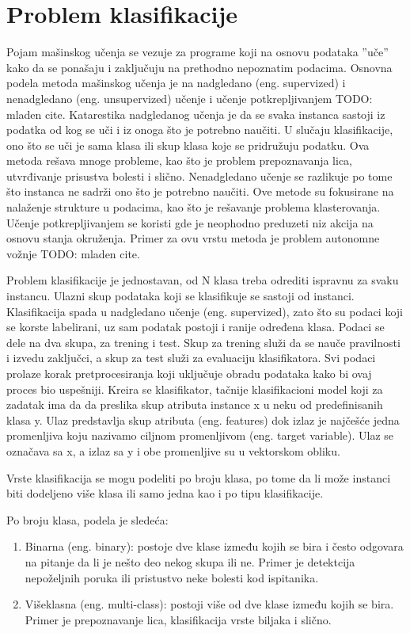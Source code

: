 \documentclass[12pt,oneside]{memoir}
\begin{document}
\chapter{Problem klasifikacije}

Pojam mašinskog učenja se vezuje za programe koji na osnovu podataka ”uče” kako da se ponašaju i zaključuju na prethodno nepoznatim podacima. Osnovna podela metoda mašinskog učenja je na nadgledano (eng. supervized) i nenadgledano (eng. unsupervized) učenje i učenje potkrepljivanjem TODO: mladen cite. Katarestika nadgledanog učenja je da se svaka instanca sastoji iz podatka od kog se uči i iz onoga što je potrebno naučiti. U slučaju klasifikacije, ono što se uči je sama klasa ili skup klasa koje se pridružuju podatku. Ova metoda rešava mnoge probleme, kao što je problem prepoznavanja lica, utvrđivanje prisustva bolesti i slično. Nenadgledano učenje se razlikuje po tome što instanca ne sadrži ono što je potrebno naučiti. Ove metode su fokusirane na nalaženje strukture u podacima, kao što je rešavanje problema klasterovanja. Učenje potkrepljivanjem se koristi gde je neophodno preduzeti niz akcija na osnovu stanja okruženja. Primer za ovu vrstu metoda je problem autonomne vožnje TODO: mladen cite.

Problem klasifikacije je jednostavan, od N klasa treba odrediti ispravnu za svaku instancu. Ulazni skup podataka koji se klasifikuje se sastoji od instanci. Klasifikacija spada u nadgledano učenje (eng. supervized), zato što su podaci koji se korste labelirani, uz sam podatak postoji i ranije određena klasa. Podaci se dele na dva skupa, za trening i test. Skup za trening služi da se nauče pravilnosti i izvedu zaključci, a skup za test služi za evaluaciju klasifikatora. Svi podaci prolaze korak pretprocesiranja koji uključuje obradu podataka kako bi ovaj proces bio uspešniji. Kreira se klasifikator, tačnije klasifikacioni model koji za zadatak ima da da preslika skup atributa instance x u neku od predefinisanih klasa y. Ulaz predstavlja skup atributa (eng. features) dok izlaz je najčešće jedna promenljiva koju nazivamo ciljnom promenljivom (eng. target variable). Ulaz se označava sa x, a izlaz sa y i obe promenljive su u vektorskom obliku.

Vrste klasifikacija se mogu podeliti po broju klasa, po tome da li može instanci biti dodeljeno više klasa ili samo jedna kao i po tipu klasifikacije.

Po broju klasa, podela je sledeća:

\begin{enumerate}
\item Binarna (eng. binary): postoje dve klase između kojih se bira i često odgovara na pitanje da li je nešto deo nekog skupa ili ne. Primer je detektcija nepoželjnih poruka ili pristustvo neke bolesti kod ispitanika.
\item Višeklasna (eng. multi-class): postoji više od dve klase između kojih se bira. Primer je prepoznavanje lica, klasifikacija vrste biljaka i slično. 
\end{enumerate}
\end{document}
